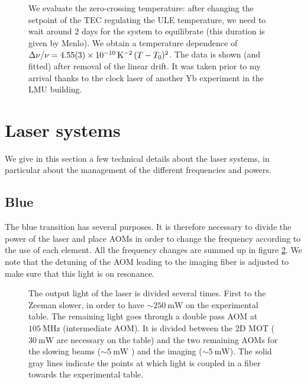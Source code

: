 \documentclass[11pt]{article}
\numberwithin{equation}{section}
\numberwithin{figure}{section}
\begin{document}
%
\begin{figure}[htbp]
	\centering
    
    \caption{\small We evaluate the zero-crossing temperature: after changing the setpoint of the TEC regulating the ULE temperature, we need to wait around 2 days for the system to equilibrate (this duration is given by Menlo). We obtain a temperature dependence of $\Delta \nu / \nu = \num{4.55\pm0.03}\times \SI{e-10}{\per\kelvin\squared}\, (T - T_0)^2$. The data is shown (and fitted) after removal of the linear drift. It was taken prior to my arrival thanks to the clock laser of another Yb experiment in the LMU building.}
    \label{fig:zero_crossing}
\end{figure}
%

\newpage

\section{Laser systems}
\label{sec:laser_appendix}

We give in this section a few technical details about the laser systems, in particular about the management of the different frequencies and powers.

\subsection*{Blue} 
The blue transition has several purposes. It is therefore necessary to divide the power of the laser and place AOMs in order to change the frequency according to the use of each element. All the frequency changes are summed up in figure \ref{fig:blue_AOM}. We note that the detuning of the AOM leading to the imaging fiber is adjusted to make sure that this light is on resonance. 

%
\begin{figure}[htbp]
	\centering
	\def\svgwidth{0.55\linewidth}
    
    \caption{\small The output light of the laser is divided several times. First to the Zeeman slower, in order to have $\sim \SI{250}{\milli\watt}$ on the experimental table. The remaining light goes through a double pass AOM at $\SI{105}{\mega\hertz}$ (intermediate AOM). It is divided between the 2D MOT ($\SI{30}{\milli\watt}$ are necessary on the table) and the two remaining AOMs for the slowing beams ($\sim \SI{5}{\milli\watt}$ ) and the imaging ($\sim \SI{5}{\milli\watt}$). The solid gray lines indicate the points at which light is coupled in a fiber towards the experimental table.}
    \label{fig:blue_AOM}
\end{figure}
%
\end{document}
